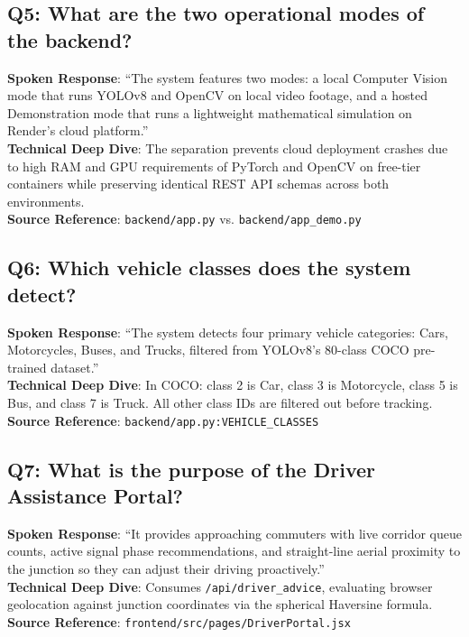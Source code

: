 \documentclass[11pt,a4paper,oneside]{report}
\begin{document}
\subsection*{Q5: What are the two operational modes of the backend?}
\begin{interviewbox}
\textbf{Spoken Response}: ``The system features two modes: a local Computer Vision mode that runs YOLOv8 and OpenCV on local video footage, and a hosted Demonstration mode that runs a lightweight mathematical simulation on Render's cloud platform.''\\
\textbf{Technical Deep Dive}: The separation prevents cloud deployment crashes due to high RAM and GPU requirements of PyTorch and OpenCV on free-tier containers while preserving identical REST API schemas across both environments.\\
\textbf{Source Reference}: \texttt{backend/app.py} vs. \texttt{backend/app\_demo.py}
\end{interviewbox}

\subsection*{Q6: Which vehicle classes does the system detect?}
\begin{interviewbox}
\textbf{Spoken Response}: ``The system detects four primary vehicle categories: Cars, Motorcycles, Buses, and Trucks, filtered from YOLOv8's 80-class COCO pre-trained dataset.''\\
\textbf{Technical Deep Dive}: In COCO: class 2 is Car, class 3 is Motorcycle, class 5 is Bus, and class 7 is Truck. All other class IDs are filtered out before tracking.\\
\textbf{Source Reference}: \texttt{backend/app.py:VEHICLE\_CLASSES}
\end{interviewbox}

\subsection*{Q7: What is the purpose of the Driver Assistance Portal?}
\begin{interviewbox}
\textbf{Spoken Response}: ``It provides approaching commuters with live corridor queue counts, active signal phase recommendations, and straight-line aerial proximity to the junction so they can adjust their driving proactively.''\\
\textbf{Technical Deep Dive}: Consumes \texttt{/api/driver\_advice}, evaluating browser geolocation against junction coordinates via the spherical Haversine formula.\\
\textbf{Source Reference}: \texttt{frontend/src/pages/DriverPortal.jsx}
\end{interviewbox}
\end{document}
